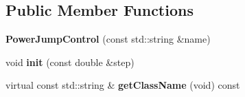 \subsection*{Public Member Functions}
\begin{DoxyCompactItemize}
\item 
{\bfseries Power\+Jump\+Control} (const std\+::string \&name)\hypertarget{classdynamicgraph_1_1sot_1_1PowerJumpControl_aabafd0843366b3acb467e48176bc7b73}{}\label{classdynamicgraph_1_1sot_1_1PowerJumpControl_aabafd0843366b3acb467e48176bc7b73}

\item 
void {\bfseries init} (const double \&step)\hypertarget{classdynamicgraph_1_1sot_1_1PowerJumpControl_a5dd3a47fb9562e5d0092548b9fd24065}{}\label{classdynamicgraph_1_1sot_1_1PowerJumpControl_a5dd3a47fb9562e5d0092548b9fd24065}

\item 
virtual const std\+::string \& {\bfseries get\+Class\+Name} (void) const \hypertarget{classdynamicgraph_1_1sot_1_1PowerJumpControl_ac41cfcea928c9b79550b4a6ae598a6f8}{}\label{classdynamicgraph_1_1sot_1_1PowerJumpControl_ac41cfcea928c9b79550b4a6ae598a6f8}

\end{DoxyCompactItemize}
